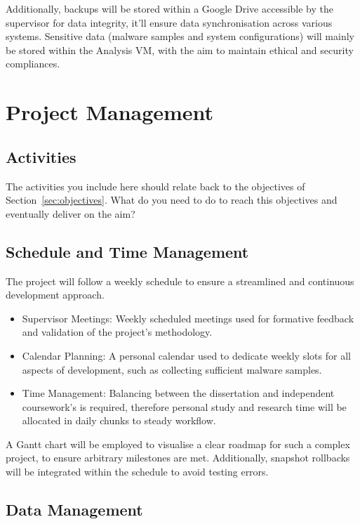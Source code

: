 \documentclass[a4paper,12pt,oneside]{book}			%
\begin{document}
Additionally, backups will be stored within a Google Drive accessible by the supervisor for data integrity, it’ll ensure data synchronisation across various systems. Sensitive data (malware samples and system configurations) will mainly be stored within the Analysis VM, with the aim to maintain ethical and security compliances. 


\chapter{Project Management}\label{ch:project management}
\section{Activities}\label{sec:activities}

The activities you include here should relate back to the objectives of Section~\ref{sec:objectives}. What do you need to do to reach this objectives and eventually deliver on the aim?

\section{Schedule and Time Management}\label{sec:time management}

The project will follow a weekly schedule to ensure a streamlined and continuous development approach.
\begin{itemize}
	\item Supervisor Meetings: Weekly scheduled meetings used for formative feedback and validation of the project’s methodology.
	\item Calendar Planning: A personal calendar used to dedicate weekly slots for all aspects of development, such as collecting sufficient malware samples. 
	\item Time Management: Balancing between the dissertation and independent coursework’s is required, therefore personal study and research time will be allocated in daily chunks to steady workflow. 
\end{itemize}

A Gantt chart will be employed to visualise a clear roadmap for such a complex project, to ensure arbitrary milestones are met. Additionally, snapshot rollbacks will be integrated within the schedule to avoid testing errors.



\section{Data Management}\label{sec:data management}
\end{document}

